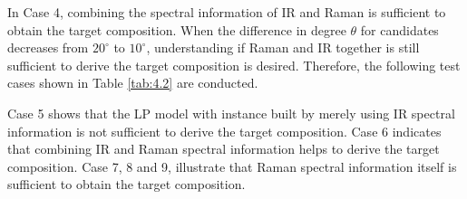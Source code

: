 In Case 4, combining the spectral information of IR and Raman is sufficient to obtain the target composition. When the difference in degree $\theta$ for candidates decreases from $20^{\circ}$ to $10^{\circ}$, understanding if Raman and IR together is still sufficient to derive the target composition is desired. Therefore, the following test cases shown in Table \ref{tab:4.2} are conducted. \\

\begin{table}[ht!] \tiny 
{}
\caption{Test case 5 to 9 for Met candidates.}
\label{tab:4.2}
\end{table}	

Case 5 shows that the LP model with instance built by merely using IR spectral information is not sufficient to derive the target composition. Case 6 indicates that combining IR and Raman spectral information helps to derive the target composition. Case 7, 8 and 9, illustrate that Raman spectral information itself is sufficient to obtain the target composition. \\

